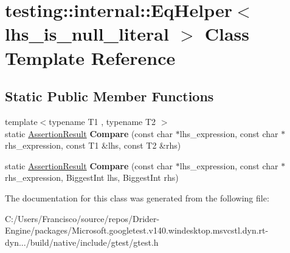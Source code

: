 \hypertarget{classtesting_1_1internal_1_1_eq_helper}{}\section{testing\+:\+:internal\+:\+:Eq\+Helper$<$ lhs\+\_\+is\+\_\+null\+\_\+literal $>$ Class Template Reference}
\label{classtesting_1_1internal_1_1_eq_helper}
\subsection*{Static Public Member Functions}
\begin{DoxyCompactItemize}
\item 
\mbox{\label{classtesting_1_1internal_1_1_eq_helper_ae3572c7374534a916b9117efaa89f33f}} 
{\footnotesize template$<$typename T1 , typename T2 $>$ }\\static \hyperlink{classtesting_1_1_assertion_result}{Assertion\+Result} {\bfseries Compare} (const char $\ast$lhs\+\_\+expression, const char $\ast$rhs\+\_\+expression, const T1 \&lhs, const T2 \&rhs)
\item 
\mbox{\label{classtesting_1_1internal_1_1_eq_helper_aaa42c0059bb3dcc43d556243febb5f1c}} 
static \hyperlink{classtesting_1_1_assertion_result}{Assertion\+Result} {\bfseries Compare} (const char $\ast$lhs\+\_\+expression, const char $\ast$rhs\+\_\+expression, Biggest\+Int lhs, Biggest\+Int rhs)
\end{DoxyCompactItemize}


The documentation for this class was generated from the following file\+:\begin{DoxyCompactItemize}
\item 
C\+:/\+Users/\+Francisco/source/repos/\+Drider-\/\+Engine/packages/\+Microsoft.\+googletest.\+v140.\+windesktop.\+msvcstl.\+dyn.\+rt-\/dyn.../build/native/include/gtest/gtest.\+h\end{DoxyCompactItemize}
